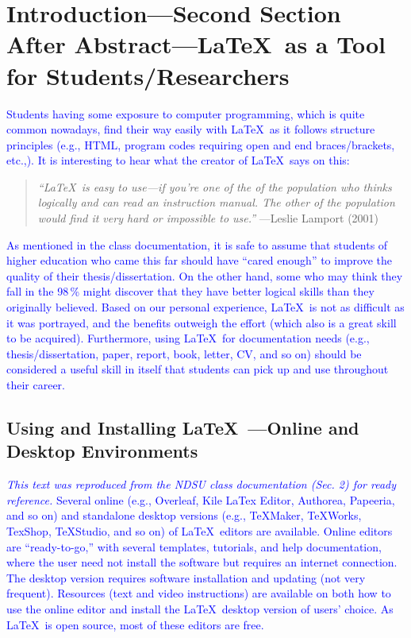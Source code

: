 \documentclass[phd]{ndsu-thesis-2022}
\newcommand\italk[1]{\textcolor{blue}{#1}}  %
\begin{document}
\vspace{-5ex}
\section{Introduction---Second Section After Abstract---\LaTeX\ as a Tool for Students/Researchers}
\italk{Students having some exposure to computer programming, which is quite common nowadays, find their way easily with \LaTeX\ as it follows structure principles (e.g., HTML, program codes requiring open and end braces/brackets, etc.,). It is interesting to hear what the creator of \LaTeX\ says on this:} 
\textcolor{magenta}{
\begin{quote}
\singlespacing
\raggedright
\textit{``\LaTeX\ is easy to use---if you're one of the  of the population who thinks logically and can read an instruction manual. The other  of the population would find it very hard or impossible to use.''} 
\hfill---Leslie Lamport (2001)
\end{quote}
}

\italk{As mentioned in the class documentation, it is safe to assume that students of higher education who came this far should have ``cared enough'' to improve the quality of their thesis/dissertation. On the other hand, some who may think they fall in the 98\,\% might discover that they have better logical skills than they originally believed. Based on our personal experience, \LaTeX\ is not as difficult as it was portrayed, and the benefits outweigh the effort (which also is a great skill to be acquired). Furthermore, using \LaTeX\ for documentation needs (e.g., thesis/dissertation, paper, report, book, letter, CV, and so on) should be considered a useful skill in itself that students can pick up and use throughout their career. 
} 

\subsection{Using and Installing \LaTeX\ ---Online and Desktop Environments}  
\italk{\emph{This text was reproduced from the NDSU class documentation (Sec. 2) for ready reference.} Several online (e.g., Overleaf, Kile LaTex Editor, Authorea, Papeeria, and so on) and standalone desktop versions (e.g., TeXMaker, TeXWorks, TexShop, TeXStudio, and so on) of \LaTeX\ editors are available. Online editors are ``ready-to-go,'' with several templates, tutorials, and help documentation, where the user need not install the software but requires an internet connection. The desktop version requires software installation and updating (not very frequent). Resources (text and video instructions) are available on both how to use the online editor and install the \LaTeX\ desktop version of users' choice. As \LaTeX\ is open source, most of these editors are free.}
\end{document}
